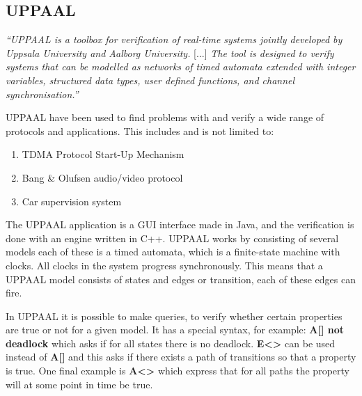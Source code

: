 \subsection{UPPAAL}\label{subsec:uppaal}
\begin{tcolorbox}[floatplacement=b,float,colback=white!5,colframe=aaublue!50,title=What is UPPAAL? \cite{tutorial04}]
\textit{``UPPAAL is a toolbox for verification of real-time systems jointly developed by Uppsala University and Aalborg University.} [...] \textit{The tool is designed to verify systems that can be modelled as networks of timed automata extended with integer variables, structured data types, user defined functions, and channel synchronisation.''}
\end{tcolorbox} 

UPPAAL have been used to find problems with and verify a wide range of protocols and applications. 
This includes and is not limited to: 
\begin{enumerate}[label=\itshape \alph*\upshape)]
    \item TDMA Protocol Start-Up Mechanism \cite{Lonn:1997:FVT:826040.827011}
    \item Bang \& Olufsen audio/video protocol \cite{Havelund97formalmodeling}
    \item Car supervision system \cite{gebremichael2004formal}
\end{enumerate}
The UPPAAL application is a GUI interface made in Java, and the verification is done with an engine written in C++. 
UPPAAL works by consisting of several models each of these is a timed automata, which is a finite-state machine with clocks. 
All clocks in the system progress synchronously. 
This means that a UPPAAL model consists of states and edges or transition, each of these edges can fire. 

In UPPAAL it is possible to make queries, to verify whether certain properties are true or not for a given model.
It has a special syntax, for example: \textbf{A[] not deadlock} which asks if for all states there is no deadlock.
\textbf{E<>} can be used instead of \textbf{A[]} and this asks if there exists a path of transitions so that a property is true.
One final example is \textbf{A<>} which express that for all paths the property will at some point in time be true.
